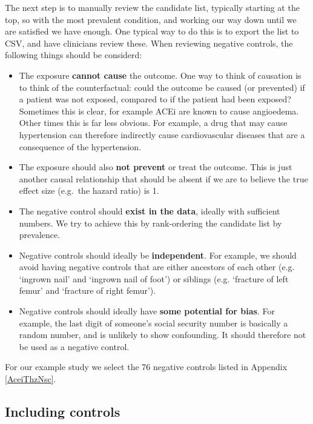\documentclass[]{book}
\providecommand{\tightlist}{%
  \setlength{\itemsep}{0pt}\setlength{\parskip}{0pt}}
\begin{document}
The next step is to manually review the candidate list, typically
starting at the top, so with the most prevalent condition, and working
our way down until we are satisfied we have enough. One typical way to
do this is to export the list to CSV, and have clinicians review these.
When reviewing negative controls, the following things should be
considerd:

\begin{itemize}
\tightlist
\item
  The exposure \textbf{cannot cause} the outcome. One way to think of
  causation is to think of the counterfactual: could the outcome be
  caused (or prevented) if a patient was not exposed, compared to if the
  patient had been exposed? Sometimes this is clear, for example ACEi
  are known to cause angioedema. Other times this is far less obvious.
  For example, a drug that may cause hypertension can therefore
  indirectly cause cardiovascular diseases that are a consequence of the
  hypertension.
\item
  The exposure should also \textbf{not prevent} or treat the outcome.
  This is just another causal relationship that should be absent if we
  are to believe the true effect size (e.g.~the hazard ratio) is 1.
\item
  The negative control should \textbf{exist in the data}, ideally with
  sufficient numbers. We try to achieve this by rank-ordering the
  candidate list by prevalence.
\item
  Negative controls should ideally be \textbf{independent}. For example,
  we should avoid having negative controls that are either ancestors of
  each other (e.g. `ingrown nail' and `ingrown nail of foot') or
  siblings (e.g. `fracture of left femur' and `fracture of right
  femur').
\item
  Negative controls should ideally have \textbf{some potential for
  bias}. For example, the last digit of someone's social security number
  is basically a random number, and is unlikely to show confounding. It
  should therefore not be used as a negative control.
\end{itemize}

For our example study we select the 76 negative controls listed in
Appendix \ref{AceiThzNsc}.

\subsection{Including controls}\label{including-controls}
\end{document}
